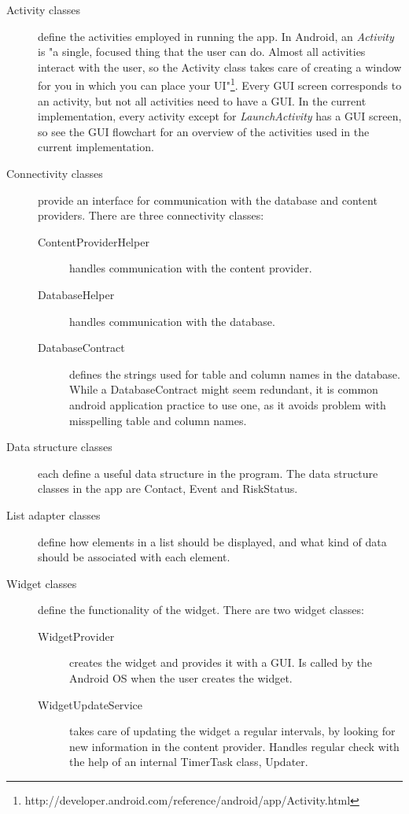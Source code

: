 \begin{description}

\item[Activity classes]
define the activities employed in running the app. In Android, an \emph{Activity} is "a single, focused thing that the user can do. Almost all activities interact with the user, so the Activity class takes care of creating a window for you in which you can place your UI"\footnote{http://developer.android.com/reference/android/app/Activity.html}. Every GUI screen corresponds to an activity, but not all activities need to have a GUI. In the current implementation, every activity except for \textit{LaunchActivity} has a GUI screen, so see the GUI flowchart for an overview of the activities used in the current implementation. 

\item[Connectivity classes]
provide an interface for communication with the database and content providers. There are three connectivity classes:
\begin{description}
\item[ContentProviderHelper] handles communication with the content provider.
\item[DatabaseHelper] handles communication with the database.
\item[DatabaseContract] defines the strings used for table and column names in the database. While a DatabaseContract might seem redundant, it is common android application practice to use one, as it avoids problem with misspelling table and column names.
\end{description}

\item[Data structure classes]
each define a useful data structure in the program. The data structure classes in the app are Contact, Event and RiskStatus.

\item[List adapter classes]
define how elements in a list should be displayed, and what kind of data should be associated with each element.

\item[Widget classes]
define the functionality of the widget. There are two widget classes:
\begin{description}
\item[WidgetProvider] creates the widget and provides it with a GUI. Is called by the Android OS when the user creates the widget.
\item[WidgetUpdateService] takes care of updating the widget a regular intervals, by looking for new information in the content provider. Handles regular check with the help of an internal TimerTask class, Updater.
\end{description}
\end{description}
